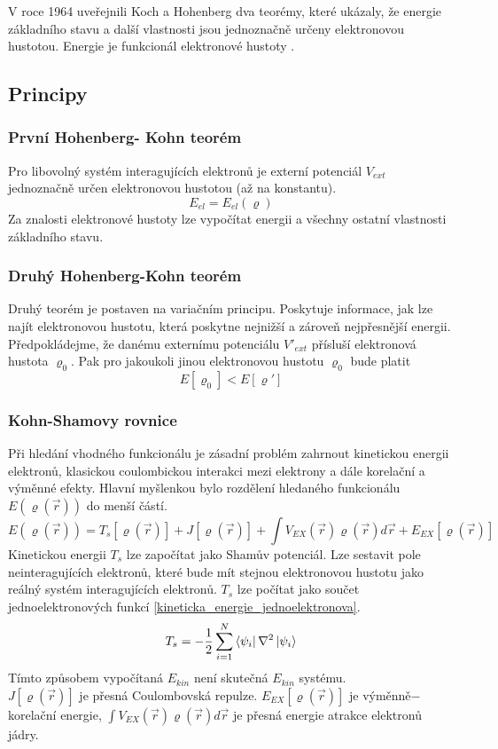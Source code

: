 \documentclass[
  digital, %
  table,   %
  lof,     %
  lot,     %
]{fithesis3}
\begin{document}
V roce 1964 uveřejnili Koch a Hohenberg dva teorémy, které ukázaly, že energie základního stavu  a další vlastnosti jsou jednoznačně určeny elektronovou hustotou. Energie je funkcionál elektronové hustoty .
\cite{lechamolecularmodeling}
\subsection{Principy}
\subsubsection{První Hohenberg- Kohn teorém}
Pro libovolný systém interagujících elektronů je externí potenciál $V_{ext}$ jednoznačně
určen elektronovou hustotou (až na konstantu). \cite{dftshrnutivysledky}
\begin{equation}
E_{el} = E_{el} (\varrho)
\end{equation}
 Za znalosti elektronové hustoty lze vypočítat energii a všechny ostatní vlastnosti základního stavu.
\subsubsection{Druhý Hohenberg-Kohn teorém}
Druhý teorém je postaven na variačním principu. Poskytuje informace, jak lze najít elektronovou hustotu, která poskytne nejnižší a zároveň nejpřesnější energii.
\cite{koch2000chemist} 
Předpokládejme, že danému externímu potenciálu $V'_{ext}$ přísluší elektronová hustota
$\varrho_0$. Pak pro jakoukoli jinou elektronovou hustotu $\varrho_0$ bude platit
\begin{equation}
E [\varrho_0] < E[\varrho ']
\end{equation}

\subsubsection{Kohn-Shamovy rovnice}
Při hledání vhodného funkcionálu je zásadní problém zahrnout kinetickou energii elektronů, klasickou coulombickou interakci mezi elektrony a dále korelační a výměnné efekty. Hlavní myšlenkou bylo rozdělení hledaného funkcionálu $E(\varrho(\vec{r}))$ do menší částí. \cite{koch2000chemist}
\begin{equation}
E(\varrho(\vec{r})) = T_s[\varrho(\vec{r})] + J[\varrho(\vec{r})] + \int V_{EX}(\vec{r})\varrho(\vec{r})d\vec{r} + E_{EX}[\varrho(\vec{r})]
\end{equation}
 Kinetickou energii $T_s$ lze započítat jako Shamův potenciál. Lze sestavit pole neinteragujících elektronů, které bude mít stejnou elektronovou hustotu jako reálný systém interagujících elektronů. $T_{s}$ lze počítat jako součet jednoelektronových funkcí \ref{kineticka_energie_jednoelektronova}. \cite{koch2000chemist}
\begin{equation}
T_s = -\frac{1}{2} \sum_{i=1} ^{N}  \bra{\psi_i}{\nabla^{2}}\ket{\psi_i}
\label{kineticka_energie_jednoelektronova}
\end{equation}
Tímto způsobem vypočítaná $E_{kin}$ není skutečná $E_{kin}$ systému. \\
$J[\varrho(\vec{r})]$ je přesná Coulombovská repulze. $E_{EX}[\varrho(\vec{r})]$ je výměnně$-$korelační energie, $\int V_{EX}(\vec{r})\varrho(\vec{r})d\vec{r}$ je přesná energie atrakce elektronů jádry.
\end{document}

